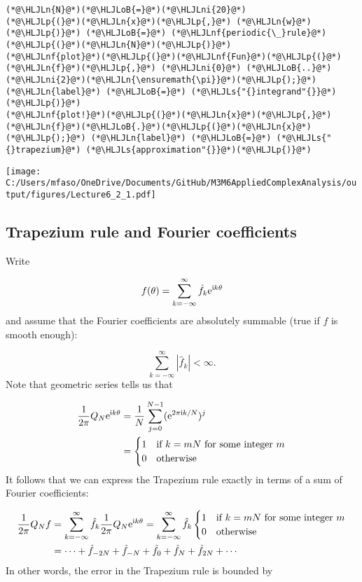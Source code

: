 \documentclass[12pt,a4paper]{article}
\newcommand{\HLJLn}[1]{#1}
\newcommand{\HLJLnf}[1]{\textcolor[RGB]{66,102,213}{#1}}
\newcommand{\HLJLs}[1]{\textcolor[RGB]{201,61,57}{#1}}
\newcommand{\HLJLni}[1]{\textcolor[RGB]{59,151,46}{#1}}
\newcommand{\HLJLoB}[1]{\textcolor[RGB]{102,102,102}{\textbf{#1}}}
\newcommand{\HLJLp}[1]{#1}
\def\I{ {\rm i} }
\def\E{ {\rm e} }
\begin{document}
\begin{lstlisting}
(*@\HLJLn{N}@*)(*@\HLJLoB{=}@*)(*@\HLJLni{20}@*)
(*@\HLJLp{(}@*)(*@\HLJLn{x}@*)(*@\HLJLp{,}@*) (*@\HLJLn{w}@*)(*@\HLJLp{)}@*) (*@\HLJLoB{=}@*) (*@\HLJLnf{periodic{\_}rule}@*)(*@\HLJLp{(}@*)(*@\HLJLn{N}@*)(*@\HLJLp{)}@*)
(*@\HLJLnf{plot}@*)(*@\HLJLp{(}@*)(*@\HLJLnf{Fun}@*)(*@\HLJLp{(}@*)(*@\HLJLn{f}@*)(*@\HLJLp{,}@*) (*@\HLJLni{0}@*) (*@\HLJLoB{..}@*) (*@\HLJLni{2}@*)(*@\HLJLn{\ensuremath{\pi}}@*)(*@\HLJLp{);}@*) (*@\HLJLn{label}@*) (*@\HLJLoB{=}@*) (*@\HLJLs{"{}integrand"{}}@*)(*@\HLJLp{)}@*)
(*@\HLJLnf{plot!}@*)(*@\HLJLp{(}@*)(*@\HLJLn{x}@*)(*@\HLJLp{,}@*) (*@\HLJLn{f}@*)(*@\HLJLoB{.}@*)(*@\HLJLp{(}@*)(*@\HLJLn{x}@*)(*@\HLJLp{);}@*) (*@\HLJLn{label}@*) (*@\HLJLoB{=}@*) (*@\HLJLs{"{}trapezium}@*) (*@\HLJLs{approximation"{}}@*)(*@\HLJLp{)}@*)
\end{lstlisting}

\texttt{[image: C:/Users/mfaso/OneDrive/Documents/GitHub/M3M6AppliedComplexAnalysis/output/figures/Lecture6\_2\_1.pdf]}

\subsection{Trapezium rule and Fourier coefficients}
Write

\[
f(\theta) = \sum_{k=-\infty}^\infty \hat f_k \E^{\I k \theta}
\]
and assume that the Fourier coefficients are absolutely summable (true if $f$ is smooth enough):

\[
\sum_{k=-\infty}^\infty |\hat f_k| < \infty.
\]
Note that geometric series tells us that


\begin{align*}
{1 \over 2 \pi} Q_N \E^{\I k \theta} &= {1 \over N} \sum_{j=0}^{N-1} (\E^{2 \pi \I k /N})^j \\
    &= \begin{cases}
        1 & \hbox{if $k = m N$ for some integer $m$} \\
        0 & \hbox{otherwise}
    \end{cases}
\end{align*}
It follows that we can express the Trapezium rule exactly in terms of a sum of Fourier coefficients:


\begin{align*}
{1 \over 2 \pi} Q_N f &= \sum_{k=-\infty}^\infty \hat f_k {1 \over 2 \pi} Q_N \E^{\I k \theta} = \sum_{k=-\infty}^\infty \hat f_k \begin{cases}
        1 & \hbox{if $k = m N$ for some integer $m$} \\
        0 & \hbox{otherwise}
    \end{cases} \\
    &= \cdots + \hat f_{-2N} + \hat f_{-N} + \hat f_0 + \hat f_N + \hat f_{2N} + \cdots
\end{align*}
In other words, the error in the Trapezium rule is bounded by
\end{document}
